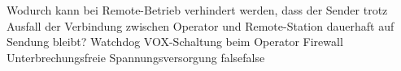     {Wodurch kann bei Remote-Betrieb verhindert werden, dass der Sender trotz Ausfall der Verbindung zwischen Operator und Remote-Station dauerhaft auf Sendung bleibt?}
    {Watchdog}
    {VOX-Schaltung beim Operator}
    {Firewall}
    {Unterbrechungsfreie Spannungsversorgung}
    {false}{false}